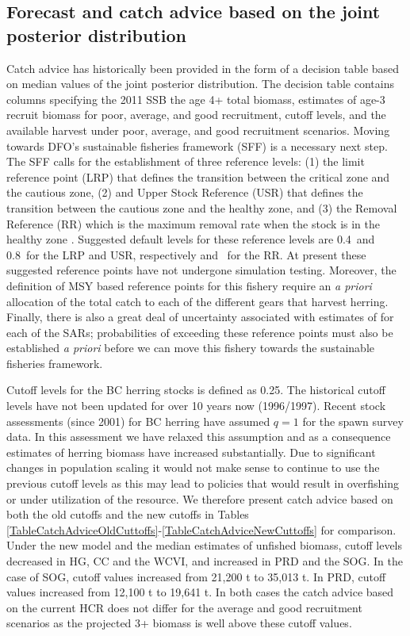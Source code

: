 
\subsection{Forecast and catch advice based on the joint posterior distribution} \label{Section:Forecast}

Catch advice has historically been provided in the form of a decision table based on median values of the joint posterior distribution.  The decision table contains columns specifying the 2011 SSB the age 4+ total biomass, estimates of age-3 recruit biomass for poor, average, and good recruitment, cutoff levels, and the available harvest under poor, average, and good recruitment scenarios.  Moving towards DFO's sustainable fisheries framework  (SFF) is a necessary next step.  The SFF calls for the establishment of three reference levels: (1) the limit reference point (LRP) that defines the transition between the critical zone and the cautious zone, (2) and Upper Stock Reference (USR) that defines the transition between the cautious zone and the healthy zone, and (3) the Removal Reference (RR) which is the maximum removal rate when the stock is in the healthy zone \citep{shelton2008s}.  Suggested default levels for these reference levels are 0.4\bmsy\ and 0.8\bmsy\ for the LRP and USR, respectively and \fmsy\ for the RR.  At present these suggested reference points have not undergone simulation testing.  Moreover, the definition of MSY based reference points for this fishery require an \textit{a priori} allocation of the total catch to each of the different gears that harvest herring.  Finally, there is also a great deal of uncertainty associated with estimates of \bmsy for each of the SARs; probabilities of exceeding these reference points must also be established \textit{a priori} before we can move this fishery towards the sustainable fisheries framework.  

Cutoff levels for the BC herring stocks is defined as 0.25\bo. The historical cutoff levels have not been updated for over 10 years now (1996/1997).  Recent stock assessments (since 2001) for BC herring have assumed $q=1$ for the spawn survey data.  In this assessment we have relaxed this assumption and as a consequence estimates of herring biomass have increased substantially.  Due to significant changes in population scaling it would not make sense to continue to use the previous cutoff levels as this may lead to policies that would result in overfishing or under utilization of the resource.  We therefore present catch advice based on both the old cutoffs and the new cutoffs in Tables \ref{TableCatchAdviceOldCuttoffs}-\ref{TableCatchAdviceNewCuttoffs} for comparison. Under the new model and the median estimates of unfished biomass, cutoff levels decreased in HG, CC and the WCVI, and increased in PRD and the SOG.  In the case of SOG, cutoff values increased from 21,200 t to 35,013 t.  In PRD, cutoff values increased from 12,100 t to 19,641 t.  In both cases the catch advice based on the current HCR does not differ for the average and good recruitment scenarios as the projected 3+ biomass is well above these cutoff values.

